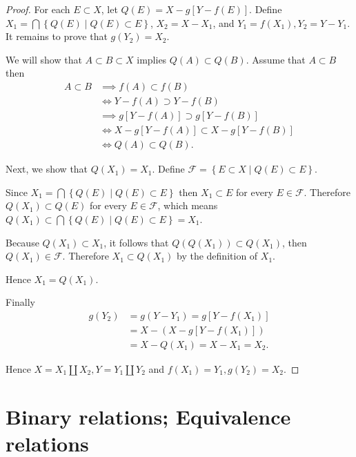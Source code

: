 \begin{proof}
	For each \( E \subset X \), let \( Q(E) = X - g[Y - f(E)] \). Define \( X_{1} = \bigcap \left\{ Q(E) \mid Q(E) \subset E \right\} \), \( X_{2} = X - X_{1} \), and \( Y_{1} = f(X_{1}), Y_{2} = Y - Y_{1} \). It remains to prove that \( g(Y_{2}) = X_{2} \).

	We will show that \( A \subset B \subset X \) implies \( Q(A) \subset Q(B) \). Assume that \( A \subset B \) then
	\begingroup
	\allowdisplaybreaks%
	\begin{align*}
		A \subset B & \implies f(A) \subset f(B)                   \\
		            & \iff Y - f(A) \supset Y - f(B)               \\
		            & \implies g[Y - f(A)] \supset g[Y - f(B)]     \\
		            & \iff X - g[Y - f(A)] \subset X - g[Y - f(B)] \\
		            & \iff Q(A) \subset Q(B).
	\end{align*}
	\endgroup

	Next, we show that \( Q(X_{1}) = X_{1} \). Define \( \mathcal{F} = \left\{ E \subset X \mid Q(E) \subset E \right\} \).

	Since \( X_{1} = \bigcap \left\{ Q(E) \mid Q(E) \subset E \right\} \) then \( X_{1} \subset E \) for every \( E \in \mathcal{F} \). Therefore \( Q(X_{1}) \subset Q(E) \) for every \( E \in \mathcal{F} \), which means \( Q(X_{1}) \subset \bigcap\left\{ Q(E) \mid Q(E) \subset E \right\} = X_{1} \).

	Because \( Q(X_{1}) \subset X_{1} \), it follows that \( Q(Q(X_{1})) \subset Q(X_{1}) \), then \( Q(X_{1}) \in \mathcal{F} \). Therefore \( X_{1} \subset Q(X_{1}) \) by the definition of \( X_{1} \).

	Hence \( X_{1} = Q(X_{1}) \).

	Finally
	\begingroup
	\allowdisplaybreaks%
	\begin{align*}
		g(Y_{2}) & = g(Y - Y_{1}) = g[Y - f(X_{1})]    \\
		         & = X - (X - g[Y - f(X_{1})])         \\
		         & = X - Q(X_{1}) = X - X_{1} = X_{2}.
	\end{align*}
	\endgroup

	Hence \( X = X_{1} \amalg X_{2}, Y = Y_{1} \amalg Y_{2} \) and \( f(X_{1}) = Y_{1}, g(Y_{2}) = X_{2} \).
\end{proof}

\section{Binary relations; Equivalence relations}

